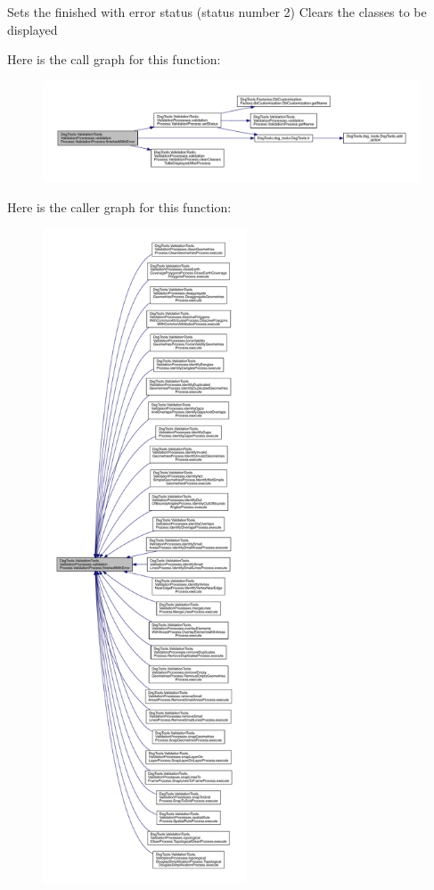 \begin{DoxyVerb}Sets the finished with error status (status number 2)
Clears the classes to be displayed
\end{DoxyVerb}
 Here is the call graph for this function\+:
\nopagebreak
\begin{figure}[H]
\begin{center}
\leavevmode
\includegraphics[width=350pt]{class_dsg_tools_1_1_validation_tools_1_1_validation_processes_1_1validation_process_1_1_validation_process_aac7b8c0a5333c380bb0af64353717fb9_cgraph}
\end{center}
\end{figure}
Here is the caller graph for this function\+:
\nopagebreak
\begin{figure}[H]
\begin{center}
\leavevmode
\includegraphics[height=550pt]{class_dsg_tools_1_1_validation_tools_1_1_validation_processes_1_1validation_process_1_1_validation_process_aac7b8c0a5333c380bb0af64353717fb9_icgraph}
\end{center}
\end{figure}
